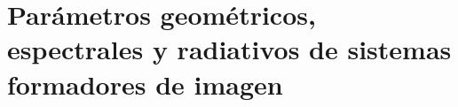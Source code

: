 
\section{Parámetros geométricos, espectrales y radiativos de sistemas formadores de imagen}

% 










